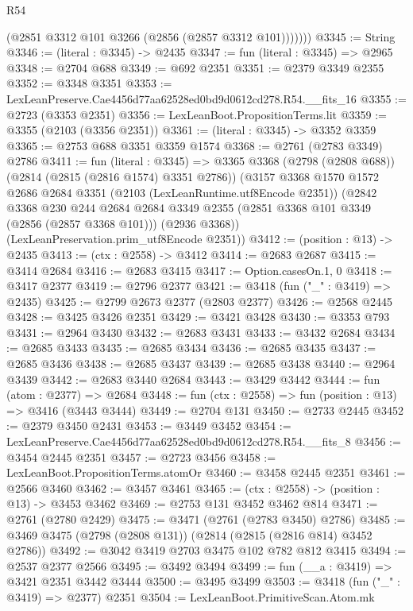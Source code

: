 \begin{lexlean}{R54}
\begin{coremodule}
            (@2851 @3312 @101 @3266 (@2856 (@2857 @3312 @101)))))))
@3345 := String
@3346 := (literal : @3345) -> @2435
@3347 := fun (literal : @3345) => @2965
@3348 := @2704 @688
@3349 := @692 @2351
@3351 := @2379 @3349 @2355
@3352 := @3348 @3351
@3353 := LexLeanPreserve.Cae4456d77aa62528ed0bd9d0612cd278.R54.__fits_16
@3355 := @2723 (@3353 @2351)
@3356 := LexLeanBoot.PropositionTerms.lit
@3359 := @3355 (@2103 (@3356 @2351))
@3361 := (literal : @3345) -> @3352 @3359
@3365 := @2753 @688 @3351 @3359 @1574
@3368 := @2761 (@2783 @3349) @2786
@3411 := fun (literal : @3345) =>
  @3365
    @3368
    (@2798 (@2808 @688))
    (@2814 (@2815 (@2816 @1574) @3351 @2786))
    (@3157
      @3368
      @1570
      @1572
      @2686
      @2684
      @3351
      (@2103 (LexLeanRuntime.utf8Encode @2351))
      (@2842
        @3368
        @230
        @244
        @2684
        @2684
        @3349
        @2355
        (@2851 @3368 @101 @3349 (@2856 (@2857 @3368 @101)))
        (@2936 @3368))
      (LexLeanPreservation.prim_utf8Encode @2351))
@3412 := (position : @13) -> @2435
@3413 := (ctx : @2558) -> @3412
@3414 := @2683 @2687
@3415 := @3414 @2684
@3416 := @2683 @3415
@3417 := Option.casesOn.{1, 0}
@3418 := @3417 @2377
@3419 := @2796 @2377
@3421 := @3418 (fun ("_" : @3419) => @2435)
@3425 := @2799 @2673 @2377 (@2803 @2377)
@3426 := @2568 @2445
@3428 := @3425 @3426 @2351
@3429 := @3421 @3428
@3430 := @3353 @793
@3431 := @2964 @3430
@3432 := @2683 @3431
@3433 := @3432 @2684
@3434 := @2685 @3433
@3435 := @2685 @3434
@3436 := @2685 @3435
@3437 := @2685 @3436
@3438 := @2685 @3437
@3439 := @2685 @3438
@3440 := @2964 @3439
@3442 := @2683 @3440 @2684
@3443 := @3429 @3442
@3444 := fun (atom : @2377) => @2684
@3448 := fun (ctx : @2558) => fun (position : @13) => @3416 (@3443 @3444)
@3449 := @2704 @131
@3450 := @2733 @2445
@3452 := @2379 @3450 @2431
@3453 := @3449 @3452
@3454 := LexLeanPreserve.Cae4456d77aa62528ed0bd9d0612cd278.R54.__fits_8
@3456 := @3454 @2445 @2351
@3457 := @2723 @3456
@3458 := LexLeanBoot.PropositionTerms.atomOr
@3460 := @3458 @2445 @2351
@3461 := @2566 @3460
@3462 := @3457 @3461
@3465 := (ctx : @2558) -> (position : @13) -> @3453 @3462
@3469 := @2753 @131 @3452 @3462 @814
@3471 := @2761 (@2780 @2429)
@3475 := @3471 (@2761 (@2783 @3450) @2786)
@3485 := @3469 @3475 (@2798 (@2808 @131)) (@2814 (@2815 (@2816 @814) @3452 @2786))
@3492 := @3042 @3419 @2703 @3475 @102 @782 @812 @3415
@3494 := @2537 @2377 @2566
@3495 := @3492 @3494
@3499 := fun (__a : @3419) => @3421 @2351 @3442 @3444
@3500 := @3495 @3499
@3503 := @3418 (fun ("_" : @3419) => @2377) @2351
@3504 := LexLeanBoot.PrimitiveScan.Atom.mk

\end{coremodule}
\end{lexlean}
